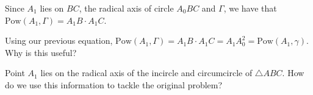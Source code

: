 



Since $A_1$ lies on $BC$, the radical axis of circle $A_0BC$ and $\Gamma$, we have that $\text{Pow}(A_1, \Gamma) = A_1B\cdot A_1C$.

Using our previous equation, $\text{Pow}(A_1, \Gamma) = A_1B\cdot A_1C = A_1A_0^2 = \text{Pow}(A_1, \gamma)$. Why is this useful?




Point $A_1$ lies on the radical axis of the incircle and circumcircle of $\triangle ABC$. How do we use this information to tackle the original problem?







